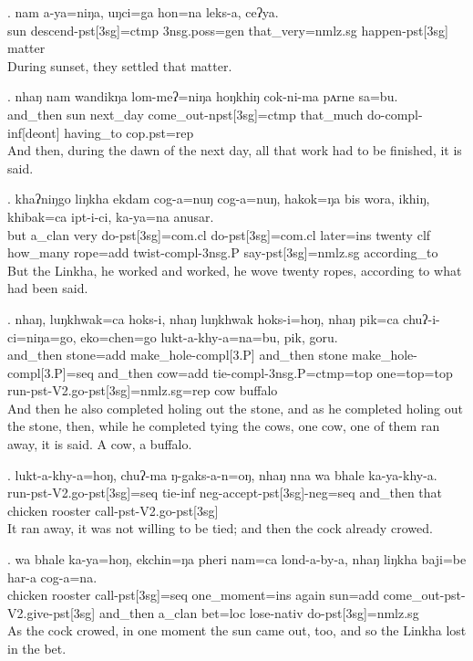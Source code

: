 \exg. nam a-ya=niŋa, uŋci=ga hon=na leks-a, ceʔya.\\
sun descend{\sc -pst[3sg]=ctmp} {\sc 3nsg.poss=gen} that\_very{\sc =nmlz.sg} happen{\sc -pst[3sg]} matter\\
During sunset, they settled that matter.


\exg. nhaŋ nam wandikŋa lom-meʔ=niŋa hoŋkhiŋ cok-ni-ma pʌrne sa=bu.\\
and\_then sun next\_day come\_out{\sc -npst[3sg]=ctmp} that\_much do{\sc -compl-inf[deont]} having\_to {\sc cop.pst=rep}\\
And then, during the dawn of the next day, all that work had to be finished, it is said.


\exg. khaʔniŋgo liŋkha ekdam cog-a=nuŋ cog-a=nuŋ, hakok=ŋa bis wora, ikhiŋ, khibak=ca ipt-i-ci, ka-ya=na anusar.\\
but a\_clan very do{\sc -pst[3sg]=com.cl} do{\sc -pst[3sg]=com.cl} later{\sc =ins} twenty {\sc clf} how\_many rope{\sc =add} twist{\sc -compl-3nsg.P} say{\sc -pst[3sg]=nmlz.sg} according\_to\\
But the Linkha, he worked and worked, he wove twenty ropes, according to what had been said.



\exg. nhaŋ, luŋkhwak=ca hoks-i, nhaŋ luŋkhwak hoks-i=hoŋ, nhaŋ pik=ca chuʔ-i-ci=niŋa=go, eko=chen=go lukt-a-khy-a=na=bu, pik, goru.\\
and\_then stone{\sc =add} make\_hole{\sc -compl[3.P]} and\_then stone make\_hole{\sc -compl[3.P]=seq} and\_then cow{\sc =add} tie{\sc -compl-3nsg.P=ctmp=top} one{\sc =top=top} run{\sc -pst-V2.go-pst[3sg]=nmlz.sg=rep} cow buffalo\\
And then he also completed holing out the stone, and as he completed holing out the stone,  then, while he completed tying the cows, one cow, one of them ran away, it is said. A cow, a  buffalo.


\exg. lukt-a-khy-a=hoŋ, chuʔ-ma ŋ-gaks-a-n=oŋ, nhaŋ nna wa bhale ka-ya-khy-a.\\
run{\sc -pst-V2.go-pst[3sg]=seq} tie{\sc -inf} {\sc neg-}accept{\sc -pst[3sg]-neg=seq} and\_then that chicken rooster call{\sc -pst-V2.go-pst[3sg]}\\
It ran away, it was not willing to be tied; and then the cock already crowed.

\largerpage[2]
\exg. wa bhale ka-ya=hoŋ, ekchin=ŋa pheri nam=ca lond-a-by-a, nhaŋ liŋkha baji=be har-a cog-a=na.\\
chicken rooster call{\sc -pst[3sg]=seq} one\_moment{\sc =ins} again sun{\sc =add} come\_out{\sc -pst-V2.give-pst[3sg]} and\_then a\_clan bet{\sc =loc} lose{\sc -nativ} do{\sc -pst[3sg]=nmlz.sg}\\
As the cock crowed, in one moment the sun came out, too,  and so the Linkha lost in the bet.


